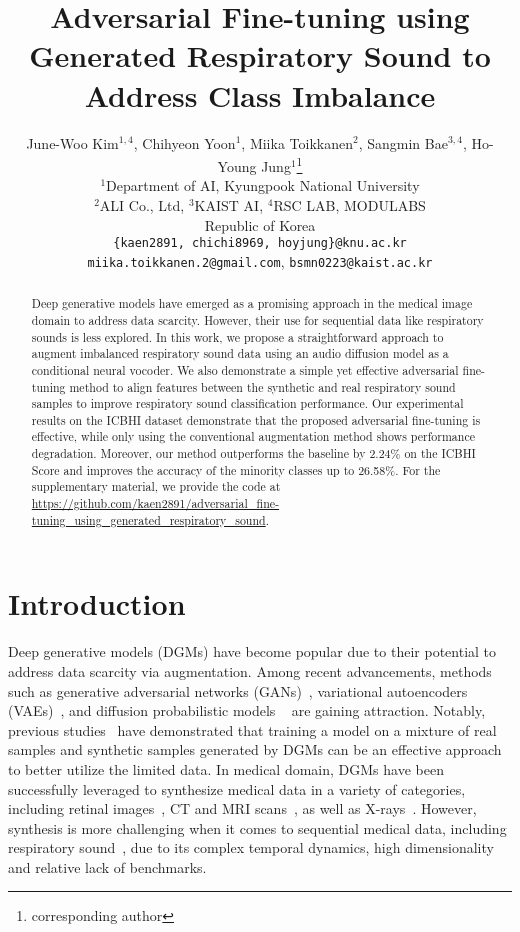 \documentclass{article}
\title{Adversarial Fine-tuning using Generated Respiratory Sound to Address Class Imbalance}
\author{June-Woo Kim$^{1,4}$, Chihyeon Yoon$^{1}$, Miika Toikkanen$^{2}$, Sangmin Bae$^{3,4}$, Ho-Young Jung$^{1}$\thanks{corresponding author}\\
$^1$Department of AI, Kyungpook National University\\ 
  $^2$ALI Co., Ltd, $^3$KAIST AI, $^4$RSC LAB, MODULABS\\
  Republic of Korea\\
  \texttt{\{kaen2891, chichi8969, hoyjung\}@knu.ac.kr}\\
  \texttt{miika.toikkanen.2@gmail.com}, \texttt{bsmn0223@kaist.ac.kr}
}
\begin{document}
\maketitle


\begin{abstract}
Deep generative models have emerged as a promising approach in the medical image domain to address data scarcity. However, their use for sequential data like respiratory sounds is less explored.
In this work, we propose a straightforward approach to augment imbalanced respiratory sound data using an audio diffusion model as a conditional neural vocoder. 
We also demonstrate a simple yet effective adversarial fine-tuning method to align features between the synthetic and real respiratory sound samples to improve respiratory sound classification performance.
Our experimental results on the ICBHI dataset demonstrate that the proposed adversarial fine-tuning is effective, while only using the conventional augmentation method shows performance degradation.
Moreover, our method outperforms the baseline by 2.24\% on the ICBHI Score and improves the accuracy of the minority classes up to 26.58\%. For the supplementary material, we provide the code at \url{https://github.com/kaen2891/adversarial_fine-tuning_using_generated_respiratory_sound}.




\end{abstract}






\section{Introduction}
Deep generative models (DGMs) have become popular due to their potential to address data scarcity via augmentation. Among recent advancements, methods such as generative adversarial networks (GANs)~\cite{goodfellow2014generative}, variational autoencoders (VAEs)~\cite{kingma2013auto}, and diffusion probabilistic models ~\cite{ho2020denoising} are gaining attraction.
Notably, previous studies~\cite{antoniou2017data, bowles2018gan} have demonstrated that training a model on a mixture of real samples and synthetic samples generated by DGMs can be an effective approach to better utilize the limited data. In medical domain, DGMs have been successfully leveraged to synthesize medical data in a variety of categories, including retinal images~\cite{costa2017end, iqbal2018generative}, CT and MRI scans~\cite{nie2017medical, shin2018medical, sandfort2019data}, as well as X-rays~\cite{loey2020within, motamed2021data}.
However, synthesis is more challenging when it comes to sequential medical data, including respiratory sound~\cite{kochetov2020generative, jayalakshmy2021conditional, saldanha2022data}, due to its complex temporal dynamics, high dimensionality and relative lack of benchmarks. 
\end{document}
